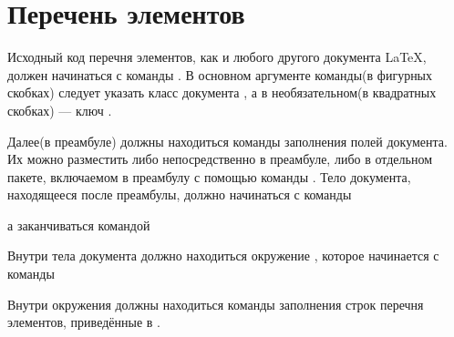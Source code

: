 
\section{Перечень элементов}

Исходный код перечня элементов, как и любого другого документа \LaTeX{}, должен
начинаться с команды . В основном аргументе
команды(в фигурных скобках) следует указать класс документа , а в
необязательном(в квадратных скобках) --- ключ .


Далее(в преамбуле) должны находиться команды заполнения полей документа. Их можно
разместить либо непосредственно в преамбуле, либо в отдельном пакете, включаемом в
преамбулу с помощью команды . Тело документа,
находящееся после преамбулы, должно начинаться с команды

\begin{pcbdoccode}

\end{pcbdoccode}

а заканчиваться командой

\begin{pcbdoccode}

\end{pcbdoccode}

Внутри тела документа должно находиться
окружение , которое начинается с команды

\begin{pcbdoccode}
\end{pcbdoccode}

Внутри окружения  должны находиться команды заполнения строк
перечня элементов, приведённые в .\newpage

